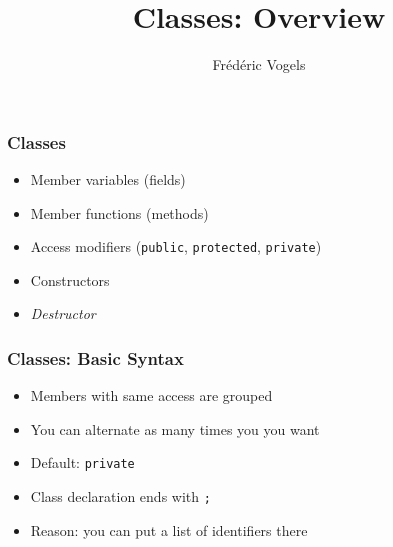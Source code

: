 \usepackage{ucll-code}
\usetikzlibrary{shadows,shapes.multipart}

\title{Classes: Overview}
\author{Fr\'ed\'eric Vogels}

\newcommand{\highlightbox}[2][]{
  \draw[opacity=.75,ultra thick,red,#1] ($ (#2.south west) + (-.1,-.1) $) rectangle ($ (#2.north east) + (.1,.1) $)
}




\begin{frame}
  \titlepage
\end{frame}

\begin{frame}
  \frametitle{Classes}
  \begin{itemize}
    \item Member variables (fields)
    \item Member functions (methods)
    \item Access modifiers ({\tt public}, {\tt protected}, {\tt private})
    \item Constructors
    \item \emph{Destructor}
  \end{itemize}
\end{frame}

\begin{frame}
  \frametitle{Classes: Basic Syntax}
  \begin{overprint}
    \begin{itemize}
      \item Members with same access are grouped
      \item You can alternate as many times you you want
      \item Default: {\tt private}
    \end{itemize}
    \begin{itemize}
      \item Class declaration ends with {\tt ;}
      \item Reason: you can put a list of identifiers there
    \end{itemize}
  \end{overprint}
\end{frame}

